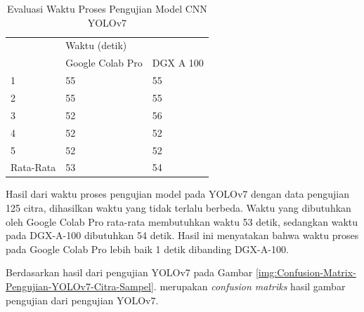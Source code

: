 \begin{singlespace}
	\begin{table}[H]
		\centering
		\caption{Evaluasi Waktu Proses Pengujian Model CNN YOLOv7}
		\label{tbl:Evaluasi-Waktu-Proses-Pengujian-Model-CNN-YOLOv7}
		\begin{tabular}{|m{2cm}|m{5cm}m{5cm}|}
			\hline
			\rowcolor[HTML]{D9D9D9} 
			\cellcolor[HTML]{D9D9D9}                       & \multicolumn{2}{l|}{\cellcolor[HTML]{D9D9D9}Waktu (detik)} \\ \cline{2-3} 
			\rowcolor[HTML]{D9D9D9} 
			\multirow{-2}{*}{\cellcolor[HTML]{D9D9D9}Fold} & \multicolumn{1}{l|}{\cellcolor[HTML]{D9D9D9}Google Colab Pro}   & DGX A 100  \\ \hline
			1                                              & \multicolumn{1}{l|}{55}                                       & 55        \\ \hline
			2                                              & \multicolumn{1}{l|}{55}                                       & 55        \\ \hline
			3                                              & \multicolumn{1}{l|}{52}                                       & 56        \\ \hline
			4                                              & \multicolumn{1}{l|}{52}                                       & 52        \\ \hline
			5                                              & \multicolumn{1}{l|}{52}                                       & 52        \\ \hline
			Rata-Rata                                      & \multicolumn{1}{l|}{53}                                       & 54        \\ \hline
		\end{tabular}
	\end{table}
\end{singlespace}

Hasil dari waktu proses pengujian model pada YOLOv7 dengan data pengujian 125 citra, dihasilkan waktu yang tidak terlalu berbeda. Waktu yang dibutuhkan oleh Google Colab Pro rata-rata membutuhkan waktu 53 detik, sedangkan waktu pada DGX-A-100 dibutuhkan 54 detik. Hasil ini menyatakan bahwa waktu proses pada Google Colab Pro lebih baik 1 detik dibanding DGX-A-100. 

Berdasarkan hasil dari pengujian YOLOv7 pada Gambar \ref{img:Confusion-Matrix-Pengujian-YOLOv7-Citra-Sampel}. merupakan \textit{confusion matriks} hasil gambar pengujian dari pengujian YOLOv7.

